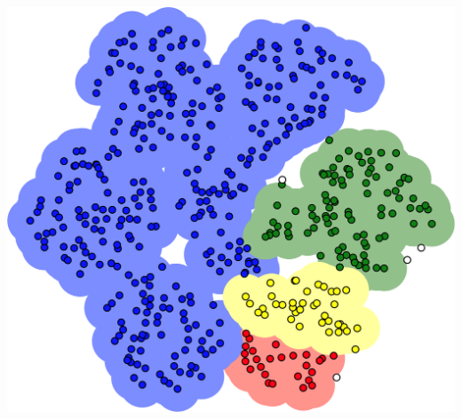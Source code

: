 \documentclass[20pt,landscape,footrule,headrule]{foils}
\begin{document}
{{\newpage
\begin{center}
\includegraphics[height=\textheight]{Images/clustering2}
\end{center}

}}
\end{document}
